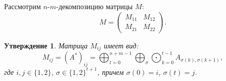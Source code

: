 \documentclass[12pt]{article}
\newtheorem{proposition}[theorem]{Утверждение}
\begin{document}
Рассмотрим $n$-$m$-декомпозицию матрицы $M$:
\begin{equation*}
M = \begin{pmatrix}
M_{11} & M_{12}\\
M_{21} & M_{22}
\end{pmatrix}.
\end{equation*}

\begin{proposition}
Матрица $M_{ij}$ имеет вид:
\begin{equation*}
M_{ij} = (A^*)_{ij} = \bigoplus_{t = 0}^{n + m - 1}\bigoplus_{\sigma}\bigodot_{k = 0}^{t - 1} A_{\sigma(k), \sigma(k + 1)},
\end{equation*}
где $i, j \in \{1, 2\}$, $\sigma \in \{1, 2\}^{t + 1}$, причем $\sigma(0) = i$, $\sigma(t) = j$.
\end{proposition}
\end{document}
